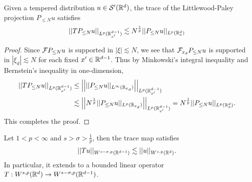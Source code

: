 \begin{lemma}
	Given a tempered distribution $u \in \mathcal S' (\mathbb R^d)$, the trace of the Littlewood-Paley projection $P_{\leq N} u$ satisfies
		\[ || TP_{\leq N} u ||_{L^p (\mathbb R^{d - 1}_{x'})} \lesssim N^{\frac1p} ||P_{\leq N} u||_{L^p (\mathbb R^d_x)} \]
\end{lemma}

\begin{proof}
	Since $\mathcal F P_{\leq N} u$ is supported in $|\xi| \lesssim N$, we see that $\mathcal F_{x_d} P_{\leq N} u$ is supported in $|\xi_d| \lesssim N$ for each fixed $x' \in \mathbb R^{d - 1}$. Thus by Minkowski's integral inequality and Bernstein's inequality in one-dimension, 
		\begin{align*}
			||T P_{\leq N} u||_{L^p (\mathbb R^{d - 1}_{x'})}
				&\leq \left|\left| || P_{\leq N} u||_{L^\infty (\mathbb R_{x_d})} \right|\right|_{L^p (\mathbb R^{d - 1}_{x'})} \\
				&\lesssim  \left|\left| N^{\frac1p} || P_{\leq N} u||_{L^p (\mathbb R_{x_d})} \right|\right|_{L^p (\mathbb R^{d - 1}_{x'})} = N^{\frac1p} ||P_{\leq N} u||_{L^p (\mathbb R^d_x)}.
		\end{align*}
	This completes the proof. 	
\end{proof}
	
\begin{theorem}
	Let $1 < p < \infty$ and $s > \sigma> \tfrac1p$, then the trace map satisfies
		\[ ||T u||_{W^{s - \sigma, p} (\mathbb R^{d - 1})} \lesssim ||u||_{W^{s, p} (\mathbb R^d)}. \]
	In particular, it extends to a bounded linear operator $T : W^{s, p} (\mathbb R^d) \to W^{s - \sigma, p} (\mathbb R^{d - 1})$.
\end{theorem}

